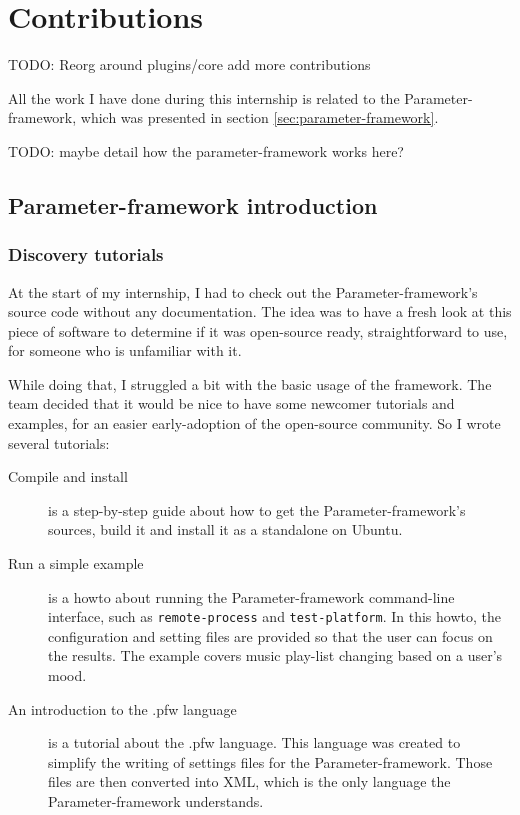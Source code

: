 \chapter{Contributions}\label{chap:contributions}

TODO:
Reorg around plugins/core add more contributions

\begin{sectionIntro}
    All the work I have done during this internship is related
    to the Parameter-framework, which was presented in section \ref{sec:parameter-framework}.

    TODO: maybe detail how the parameter-framework works here?
\end{sectionIntro}

\section{Parameter-framework introduction}
\subsection{Discovery tutorials}\label{sec:tutorials}

At the start of my internship, I had to check out the Parameter-framework's
source code without any documentation. The idea was to have a fresh look at
this piece of software to determine if it was open-source ready, straightforward
to use, for someone who is unfamiliar with it.

While doing that, I struggled a bit with the basic usage of the framework. The
team decided that it would be nice to have some newcomer tutorials and examples,
for an easier early-adoption of the open-source community. So I wrote several
tutorials:
\begin{description}
    \item[Compile and install]
        is a step-by-step guide about how to get the Parameter-framework's sources,
        build it and install it as a standalone on Ubuntu.
    \item[Run a simple example]
        is a howto about running the Parameter-framework command-line interface,
        such as \lstinline{remote-process} and \lstinline {test-platform}.  In
        this howto, the configuration and setting files are provided so that
        the user can focus on the results. The example covers music play-list
        changing based on a user's mood.
    \item[An introduction to the .pfw language]\label{desc:pfw-language}
        is a tutorial about the .pfw language. This language was
        created to simplify the writing of settings files for the
        Parameter-framework. Those files are then converted into XML, which is
        the only language the Parameter-framework understands.
\end{description}

